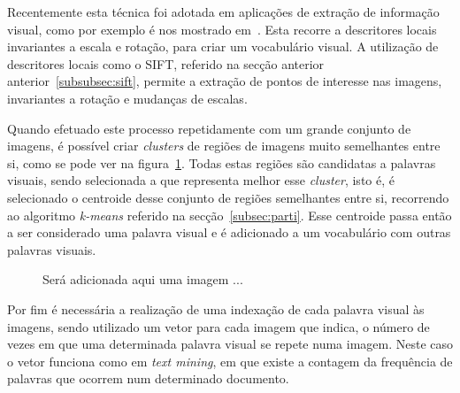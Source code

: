 Recentemente esta técnica foi adotada em aplicações de extração de informação visual, como por exemplo é nos mostrado em~\cite{Sivic2003, Sivic2006}. Esta recorre a descritores locais invariantes a escala e rotação, para criar um vocabulário visual. A utilização de descritores locais como o SIFT, referido na secção anterior anterior~\ref{subsubsec:sift}, permite a extração de pontos de interesse nas imagens, invariantes a rotação e mudanças de escalas.

Quando efetuado este processo repetidamente com um grande conjunto de imagens, é possível criar \textit{clusters} de regiões de imagens muito semelhantes entre si, como se pode ver na figura~\ref{fig:visual_word}. Todas estas regiões são candidatas a palavras visuais, sendo selecionada a que representa melhor esse \textit{cluster}, isto é, é selecionado o centroide desse conjunto de regiões semelhantes entre si, recorrendo ao algoritmo \textit{k-means} referido na secção~\ref{subsec:parti}. Esse centroide passa então a ser considerado uma palavra visual e é adicionado a um vocabulário com outras palavras visuais.

\begin{figure}[h]
\centering
Será adicionada aqui uma imagem ...
\label{fig:visual_word}
\end{figure}

%	

Por fim é necessária a realização de uma indexação de cada palavra visual às imagens, sendo utilizado um vetor para cada imagem que indica, o número de vezes em que uma determinada palavra visual se repete numa imagem. Neste caso o vetor funciona como em \textit{text mining}, em que existe a contagem da frequência de palavras que ocorrem num determinado documento.

